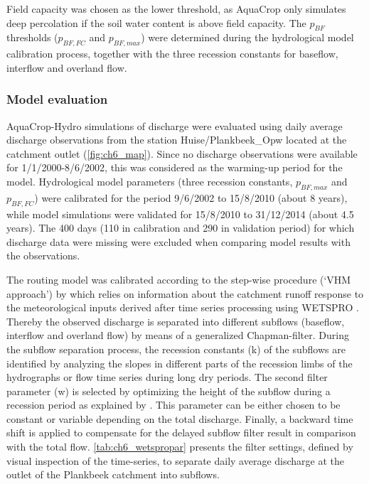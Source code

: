 Field capacity was chosen as the lower threshold, as AquaCrop only simulates deep percolation if the soil water content is above field capacity. The $p_{BF}$ thresholds ($p_{BF,FC}$ and $p_{BF,max}$) were determined during the hydrological model calibration process, together with the three recession constants for baseflow, interflow and overland flow.

\subsubsection{Model evaluation}
AquaCrop-Hydro simulations of discharge were evaluated using daily average discharge observations from the station Huise/Plankbeek\_Opw \parencite{vmm2015} located at the catchment outlet (\autoref{fig:ch6_map}). Since no discharge observations were available for 1/1/2000-8/6/2002, this was considered as the warming-up period for the model. Hydrological model parameters (three recession constants, $p_{BF,max}$ and $p_{BF,FC}$) were calibrated for the period 9/6/2002 to 15/8/2010 (about 8 years), while model simulations were validated for 15/8/2010 to 31/12/2014 (about 4.5 years). The 400 days (110 in calibration and 290 in validation period) for which discharge data were missing were excluded when comparing model results with the observations. 

The routing model was calibrated according to the step-wise procedure (`VHM approach') by \textcite{willems2014a} which relies on information about the catchment runoff response to the meteorological inputs derived after time series processing using WETSPRO \parencite{willems2009}. Thereby the observed discharge is separated into different subflows (baseflow, interflow and overland flow) by means of a generalized Chapman-filter. During the subflow separation process, the recession constants (k) of the subflows are identified by analyzing the slopes in different parts of the recession limbs of the hydrographs or flow time series during long dry periods. The second filter parameter (w) is selected by optimizing the height of the subflow during a recession period as explained by \textcite{willems2009}. This parameter can be either chosen to be constant or variable depending on the total discharge. Finally, a backward time shift is applied to compensate for the delayed subflow filter result in comparison with the total flow. \autoref{tab:ch6_wetspropar} presents the filter settings, defined by visual inspection of the time-series, to separate daily average discharge at the outlet of the Plankbeek catchment into subflows. 

